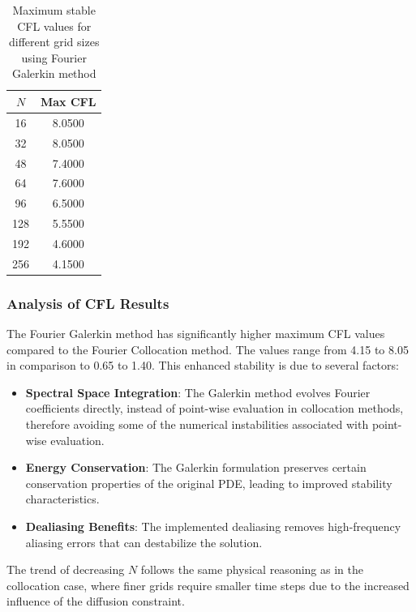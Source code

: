 \begin{table}[h]
	\centering
	\begin{tabular}{|c|c|}
		\hline
		$N$ & Max CFL \\
		\hline
		16  & 8.0500  \\
		32  & 8.0500  \\
		48  & 7.4000  \\
		64  & 7.6000  \\
		96  & 6.5000  \\
		128 & 5.5500  \\
		192 & 4.6000  \\
		256 & 4.1500  \\
		\hline
	\end{tabular}
	\caption{Maximum stable CFL values for different grid sizes using Fourier Galerkin method}
	\label{tab:cfl_galerkin}
\end{table}

\subsubsection{Analysis of CFL Results}
The Fourier Galerkin method has significantly higher maximum CFL values compared to the Fourier Collocation method. The values range from 4.15 to 8.05 in comparison to 0.65 to 1.40. This enhanced stability is due to several factors:
%
\begin{itemize}
	\item \textbf{Spectral Space Integration}: The Galerkin method evolves Fourier coefficients directly, instead of point-wise evaluation in collocation methods, therefore avoiding some of the numerical instabilities associated with point-wise evaluation.
	\item \textbf{Energy Conservation}: The Galerkin formulation preserves certain conservation properties of the original PDE, leading to improved stability characteristics.
	\item \textbf{Dealiasing Benefits}: The implemented dealiasing removes high-frequency aliasing errors that can destabilize the solution.
\end{itemize}
%
The trend of decreasing $N$ follows the same physical reasoning as in the collocation case, where finer grids require smaller time steps due to the increased influence of the diffusion constraint.

